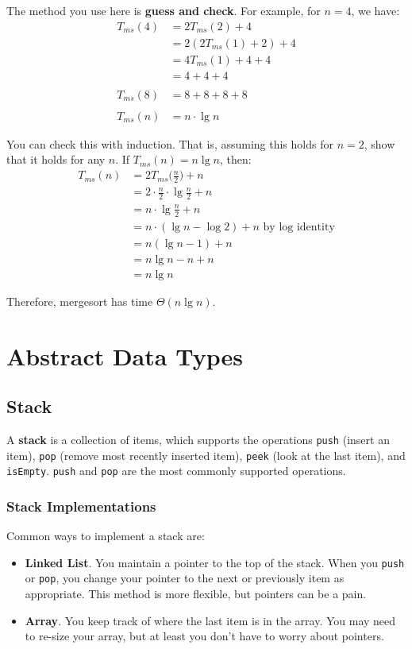 \documentclass[]{article}
\theoremstyle{definition}
\begin{document}
		The method you use here is \textbf{guess and check}. For example, for $n = 4$, we have:
		\begin{align*}
			T_{ms} (4) &= 2T_{ms}(2) + 4 \\
			&= 2(2 T_{ms}(1) + 2) + 4 \\
			&= 4T_{ms}(1) + 4 + 4 \\
			&= 4 + 4 + 4
			\\ \\
			T_{ms}(8) &= 8 + 8 + 8 + 8
			\\ \\
			T_{ms}(n) &= n \cdot \lg n
		\end{align*}

		You can check this with induction. That is, assuming this holds for $n = 2$, show that it holds for any $n$. If $T_{ms}(n) = n \lg n$, then:
		\begin{align*}
			T_{ms}(n) &= 2 T_{ms}\big( \frac{n}{2} \big) + n \\
			&= 2 \cdot \frac{n}{2} \cdot \lg \frac{n}{2} + n \\
			&= n \cdot \lg \frac{n}{2} + n \\
			&= n \cdot (\lg n - \log 2) + n \text{ by log identity} \\
			&= n(\lg n - 1) + n \\
			&= n \lg n - n + n \\
			&= n \lg n
		\end{align*}

		Therefore, mergesort has time $\Theta(n \lg n)$.
	\section{Abstract Data Types}
		\subsection{Stack}
			A \textbf{stack} is a collection of items, which supports the operations \verb+push+ (insert an item), \verb+pop+ (remove most recently inserted item), \verb+peek+ (look at the last item), and \verb+isEmpty+. \verb+push+ and \verb+pop+ are the most commonly supported operations.
			\subsubsection{Stack Implementations}
				Common ways to implement a stack are:
				\begin{itemize}
					\item \textbf{Linked List}. You maintain a pointer to the top of the stack. When you \verb+push+ or \verb+pop+, you change your pointer to the next or previously item as appropriate. This method is more flexible, but pointers can be a pain.
					\item \textbf{Array}. You keep track of where the last item is in the array. You may need to re-size your array, but at least you don't have to worry about pointers.
				\end{itemize}
\end{document}
